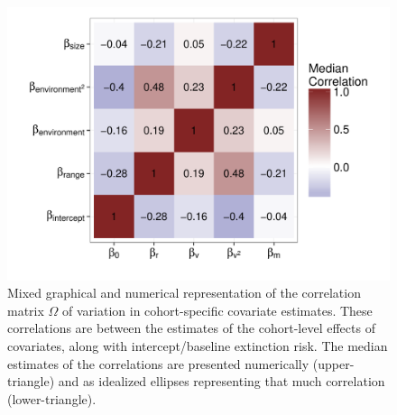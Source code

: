 \documentclass{article}
\begin{document}
\begin{figure}[ht]
  \centering
  \includegraphics[height = 0.8\textheight,width=\textwidth,keepaspectratio=true]{figure/wei_cor_heatmap}
  \caption{Mixed graphical and numerical representation of the correlation matrix \(\Omega\) of variation in cohort-specific covariate estimates. These correlations are between the estimates of the cohort-level effects of covariates, along with intercept/baseline extinction risk. The median estimates of the correlations are presented numerically (upper-triangle) and as idealized ellipses representing that much correlation (lower-triangle).}
  \label{fig:cor_posterior}
\end{figure}
\end{document}
